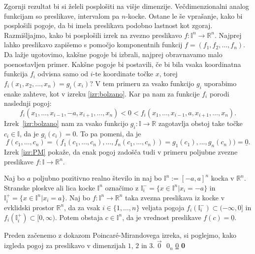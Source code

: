 \documentclass[mat1]{fmfdelo}
\newcommand{\R}{\mathbb R}
\newcommand{\I}{\mathbb I}
\newcommand{\0}{\underline{0}}
\begin{document}
Zgornji rezultat bi si želeli posplošiti na višje dimenzije. Večdimenzionalni analog funkcijam so preslikave, intervalom pa $n$-kocke. Ostane le še vprašanje, kako bi posplošili pogoje, da bi imela preslikava podobno lastnost kot zgoraj. Razmišljajmo, kako bi posplošili izrek na zvezno preslikavo $f : \I^n \to \R^n$. Najprej lahko preslikavo zapišemo s pomočjo komponentnih funkcij $f = (f_1, f_2, \dots, f_n)$. Da lažje ugotovimo, kakšne pogoje bi izbrali, najprej obravnavamo malo poenostavljen primer. Kakšne pogoje bi postavili, če bi bila vsaka koordinatna funkcija $f_i$ odvisna samo od $i$-te koordinate točke $x$, torej $f_i(x_1, x_2, \dots, x_n) = g_i(x_i)$? V tem primeru za vsako funkcijo $g_i$ uporabimo enake zahteve, kot v izreku \ref{izr:bolzano}. Kar pa nam za funkcije $f_i$ porodi naslednji pogoj: 
$$f_i(x_1, \dots, x_{i-1}, -a, x_{i+1}, \dots, x_n) < 0 < f_i(x_1, \dots, x_{i-1}, a, x_{i+1}, \dots, x_n).$$
Izrek~\ref{izr:bolzano} nam za vsako funkcijo $g_i : \I \to \R$ zagotavlja obstoj take točke $c_i \in \I$, da je $g_i(c_i) = 0$. To pa pomeni, da je $$f(c_1, \dots, c_n) = (f_1(c_1, \dots, c_n), \dots, f_n(c_1, \dots, c_n)) = g_1(c_1), \dots, g_n(c_n)) = \0.$$
Izrek \ref{izr:PM} pokaže, da enak pogoj zadošča tudi v primeru poljubne zvezne preslikave $f : \I \to \R^n$.


\begin{izrek}\label{izr:PM}
Naj bo $a$ poljubno pozitivno realno število in naj bo $\I^n := [-a, a]^n$ kocka v $\R^n$. Stranske ploskve ali lica kocke $\I^n$ označimo z $\I_i^- = \{x\in \I^n | x_i = -a\}$ in $\I_i^+ = \{x\in \I^n | x_i = a\}.$
 Naj bo $f : \I^n  \to \R^n$ taka zvezna preslikava iz kocke v evklidski prostor $\R^n$, da za vsak $i \in \{1, \dots, n\}$ veljata pogoja $f_i(\I_i^-) \subset (- \infty, 0] $ in  $f_i(\I_i^+) \subset [0, \infty) $. Potem obstaja $c \in \I^n$, da je vrednost preslikave $f(c) = \0$.
\end{izrek}
Preden začenemo z dokazom Poincar\'e-Mirandovega izreka, si poglejmo, kako izgleda pogoj za preslikavo v dimenzijah $1$, $2$ in $3$.
$\vec{0} \textbf{ } 0_n$ \underline{0} \textbf{0}
\end{document}
